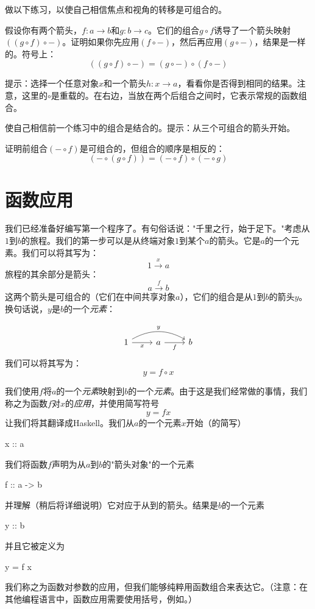 \documentclass[DaoFP]{subfiles}
\begin{document}
做以下练习，以使自己相信焦点和视角的转移是可组合的。
\begin{exercise}\label{ex-yoneda-composition}
假设你有两个箭头，$f \colon a \to b$和$g \colon b \to c$。它们的组合$g \circ f$诱导了一个箭头映射$((g \circ f) \circ -)$。证明如果你先应用$(f \circ -)$，然后再应用$(g \circ -)$，结果是一样的。符号上：
\[((g \circ f) \circ -) = (g \circ -) \circ (f \circ -)\]

提示：选择一个任意对象$x$和一个箭头$h \colon x \to a$，看看你是否得到相同的结果。注意，这里的$\circ$是重载的。在右边，当放在两个后组合之间时，它表示常规的函数组合。
\end{exercise}

\begin{exercise}
使自己相信前一个练习中的组合是结合的。提示：从三个可组合的箭头开始。
\end{exercise}

\begin{exercise}
证明前组合$(- \circ f)$是可组合的，但组合的顺序是相反的：
\[(- \circ (g \circ f)) = (- \circ f) \circ (- \circ g) \]
\end{exercise}
\section{函数应用}

我们已经准备好编写第一个程序了。有句俗话说："千里之行，始于足下。"考虑从$1$到$b$的旅程。我们的第一步可以是从终端对象$1$到某个$a$的箭头。它是$a$的一个元素。我们可以将其写为：
\[1 \xrightarrow x a \]
旅程的其余部分是箭头：
\[a \xrightarrow f b\]
这两个箭头是可组合的（它们在中间共享对象$a$），它们的组合是从$1$到$b$的箭头$y$。换句话说，$y$是$b$的一个\emph{元素}：

\[
 \begin{tikzcd}
 1
 \arrow[rr, bend left, "y"]
 \arrow[r, "x"']
 & a
 \arrow[r, "f"']
& b
 \end{tikzcd}
\]
我们可以将其写为：
\[y = f \circ x \]

我们使用$f$将$a$的一个\emph{元素}映射到$b$的一个\emph{元素}。由于这是我们经常做的事情，我们称之为函数$f$对$x$的\emph{应用}，并使用简写符号
\[y = f x \]
让我们将其翻译成Haskell。我们从$a$的一个元素$x$开始（的简写）
\begin{haskell}
x :: a
\end{haskell}
我们将函数$f$声明为从$a$到$b$的"箭头对象"的一个元素
\begin{haskell}
f :: a -> b
\end{haskell}
并理解（稍后将详细说明）它对应于从到的箭头。结果是$b$的一个元素
\begin{haskell}
y :: b
\end{haskell}
并且它被定义为
\begin{haskell}
y = f x
\end{haskell}
我们称之为函数对参数的应用，但我们能够纯粹用函数组合来表达它。（注意：在其他编程语言中，函数应用需要使用括号，例如。）
\end{document}
